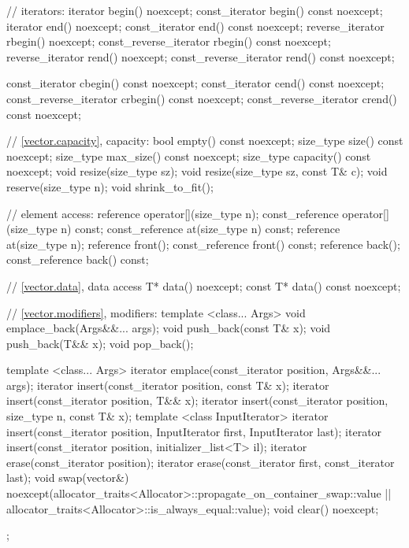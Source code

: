 \begin{codeblock}
{{    // iterators:
    iterator               begin() noexcept;
    const_iterator         begin() const noexcept;
    iterator               end() noexcept;
    const_iterator         end() const noexcept;
    reverse_iterator       rbegin() noexcept;
    const_reverse_iterator rbegin() const noexcept;
    reverse_iterator       rend() noexcept;
    const_reverse_iterator rend() const noexcept;

    const_iterator         cbegin() const noexcept;
    const_iterator         cend() const noexcept;
    const_reverse_iterator crbegin() const noexcept;
    const_reverse_iterator crend() const noexcept;

    // \ref{vector.capacity}, capacity:
    bool      empty() const noexcept;
    size_type size() const noexcept;
    size_type max_size() const noexcept;
    size_type capacity() const noexcept;
    void      resize(size_type sz);
    void      resize(size_type sz, const T& c);
    void      reserve(size_type n);
    void      shrink_to_fit();

    // element access:
    reference       operator[](size_type n);
    const_reference operator[](size_type n) const;
    const_reference at(size_type n) const;
    reference       at(size_type n);
    reference       front();
    const_reference front() const;
    reference       back();
    const_reference back() const;

    // \ref{vector.data}, data access
    T*       data() noexcept;
    const T* data() const noexcept;

    // \ref{vector.modifiers}, modifiers:
    template <class... Args> void emplace_back(Args&&... args);
    void push_back(const T& x);
    void push_back(T&& x);
    void pop_back();

    template <class... Args> iterator emplace(const_iterator position, Args&&... args);
    iterator insert(const_iterator position, const T& x);
    iterator insert(const_iterator position, T&& x);
    iterator insert(const_iterator position, size_type n, const T& x);
    template <class InputIterator>
      iterator insert(const_iterator position, InputIterator first, InputIterator last);
    iterator insert(const_iterator position, initializer_list<T> il);
    iterator erase(const_iterator position);
    iterator erase(const_iterator first, const_iterator last);
    void     swap(vector&)
      noexcept(allocator_traits<Allocator>::propagate_on_container_swap::value ||
               allocator_traits<Allocator>::is_always_equal::value);
    void     clear() noexcept;
  };

}
\end{codeblock}
